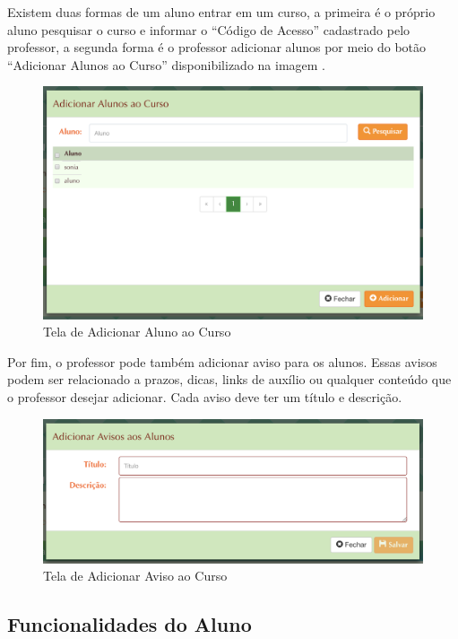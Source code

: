 Existem duas formas de um aluno entrar em um curso, a primeira é o próprio aluno pesquisar o curso e informar o “Código de Acesso” cadastrado pelo professor, a segunda forma é o professor adicionar alunos por meio do botão “Adicionar Alunos ao Curso” disponibilizado na imagem .

\begin{figure}[H]
  \centering
  \includegraphics[scale=0.55]{images/proposta-img/Figura4-33.png}
  \caption{Tela de Adicionar Aluno ao Curso}
  \label{fig:Figura4-33}
\end{figure}

Por fim, o professor pode também adicionar aviso para os alunos. Essas avisos podem ser relacionado a prazos, dicas, links de auxílio ou qualquer conteúdo que o professor desejar adicionar. Cada aviso deve ter um título e descrição.

\begin{figure}[H]
  \centering
  \includegraphics[scale=0.55]{images/proposta-img/Figura4-34.png}
  \caption{Tela de Adicionar Aviso ao Curso}
  \label{fig:Figura4-34}
\end{figure}

\subsection{Funcionalidades do Aluno}

